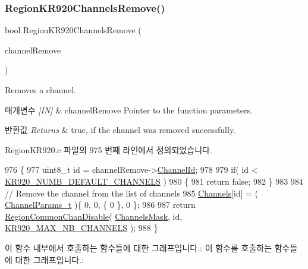\subsubsection{\texorpdfstring{Region\+K\+R920\+Channels\+Remove()}{RegionKR920ChannelsRemove()}}
{\footnotesize\ttfamily bool Region\+K\+R920\+Channels\+Remove (\begin{DoxyParamCaption}\item[{\mbox{\hyperlink{group___r_e_g_i_o_n_gaa37468560d2fc81a977b57a48e5d72c0}{Channel\+Remove\+Params\+\_\+t}} $\ast$}]{channel\+Remove }\end{DoxyParamCaption})}



Removes a channel. 


\begin{DoxyParams}{매개변수}
{\em \mbox{[}\+I\+N\mbox{]}} & channel\+Remove Pointer to the function parameters.\\
\hline
\end{DoxyParams}

\begin{DoxyRetVals}{반환값}
{\em Returns} & true, if the channel was removed successfully. \\
\hline
\end{DoxyRetVals}


Region\+K\+R920.\+c 파일의 975 번째 라인에서 정의되었습니다.


\begin{DoxyCode}
976 \{
977     uint8\_t \textcolor{keywordtype}{id} = channelRemove->\mbox{\hyperlink{structs_channel_remove_params_ae23f953dc29c360e56a3c856404a3276}{ChannelId}};
978 
979     \textcolor{keywordflow}{if}( \textcolor{keywordtype}{id} < \mbox{\hyperlink{group___r_e_g_i_o_n_k_r920_ga52b61aaab6dd3422f4c0e0551fd810fa}{KR920\_NUMB\_DEFAULT\_CHANNELS}} )
980     \{
981         \textcolor{keywordflow}{return} \textcolor{keyword}{false};
982     \}
983 
984     \textcolor{comment}{// Remove the channel from the list of channels}
985     \mbox{\hyperlink{_region_k_r920_8c_aa22cc2ed5f1e155ccf4f0c0388da513e}{Channels}}[id] = ( \mbox{\hyperlink{group___l_o_r_a_m_a_c_ga1360ca6f82c6d125ea43a9dad9b56184}{ChannelParams\_t}} )\{ 0, 0, \{ 0 \}, 0 \};
986 
987     \textcolor{keywordflow}{return} \mbox{\hyperlink{group___r_e_g_i_o_n_c_o_m_m_o_n_ga695c0ab2a06edcae5b33772f639fb676}{RegionCommonChanDisable}}( \mbox{\hyperlink{_region_k_r920_8c_a2188957b5ca6af8092154d7ccbfa5757}{ChannelsMask}}, \textcolor{keywordtype}{id}, 
      \mbox{\hyperlink{group___r_e_g_i_o_n_k_r920_ga28705c59a2c19a1de8b22d294fc6bebb}{KR920\_MAX\_NB\_CHANNELS}} );
988 \}
\end{DoxyCode}
이 함수 내부에서 호출하는 함수들에 대한 그래프입니다.\+:
이 함수를 호출하는 함수들에 대한 그래프입니다.\+:
\mbox{\label{group___r_e_g_i_o_n_k_r920_ga051e60df35d85cbf2e4089bbd8fd6290}} 
